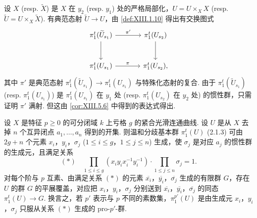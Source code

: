 设 $X$ (resp. $\widetilde{X}$) 是 $X$ 在 $y_2$ (resp. $y_1$) 处的严格局部化，$U = U \times_X X$ (resp. $\widetilde{U} = U \times_X \widetilde{X}$). 有典范态射 $\widetilde{U} \to U$，由 \ref{def:XIII.1.10} 得出有交换图式
\[
\begin{tikzcd}[row sep=large, column sep=large]
\pi^t_1(\widetilde{U}_{s_1}) \arrow[r,"{\pi'}"] \arrow[d] & \pi^t_1(U_{s_2}) \arrow[d] \\
\pi^t_1(U_{s_1}) \arrow[r,"{\pi}"] & \pi^t_1(U_{s_2}),
\end{tikzcd}
\]
其中 $\pi'$ 是典范态射 $\pi^t_1(\widetilde{U}_{s_1}) \to \pi^t_1(U_{s_1})$ 与特殊化态射的复合. 由于 $\pi^t_1(\widetilde{U}_{s_1})$ (resp. $\pi^t_1(U_{s_1})$) 是 $\pi^t_1(U_{s_1})$ 在 $y_1$ 处 (resp. $\pi^t_1(U_{s_2})$ 在 $y_2$ 处) 的惯性群，只需证明 $\pi'$ 满射. 但这由 \ref{cor:XIII.5.6} 中得到的表达式得出.

\begin{corollary}\label{cor:XIII.2.12}
设 $X$ 是特征 $p \geqslant 0$ 的可分闭域 $k$ 上亏格 $g$ 的紧合光滑连通曲线. 设 $U$ 是从 $X$ 去掉 $n$ 个互异闭点 $a_1, \ldots, a_n$ 得到的开集. 则温和分歧基本群 $\pi^t_1(U)$ (2.1.3) 可由 $2g + n$ 个元素 $x_i$，$y_i$，$\sigma_j$ ($1 \leqslant i \leqslant g$，$1 \leqslant j \leqslant n$) 生成，使 $\sigma_j$ 是对应 $a_j$ 的惯性群的生成元，且满足关系
\[
(\ast) \quad \prod_{1 \leqslant i \leqslant g} (x_i y_i x_i^{-1} y_i^{-1}) \cdot \prod_{1 \leqslant j \leqslant n} \sigma_j = 1.
\]
对每个阶与 $p$ 互素、由满足关系 $(\ast)$ 的元素 $\overline{x_i}$，$\overline{y_i}$，$\overline{\sigma_j}$ 生成的有限群 $G$，存在 $U$ 的群 $G$ 的平展覆盖，对应把 $x_i$，$y_i$，$\sigma_j$ 分别送到 $\overline{x_i}$，$\overline{y_i}$，$\overline{\sigma_j}$ 的同态 $\pi^t_1(U) \to G$. 换言之，若 $p'$ 表示与 $p$ 不同的素数集，$\pi^{p'}_1(U)$ 是由生成元 $x_i$，$y_i$，$\sigma_j$ 只服从关系 $(\ast)$ 生成的 pro-$p'$-群.
\end{corollary}

